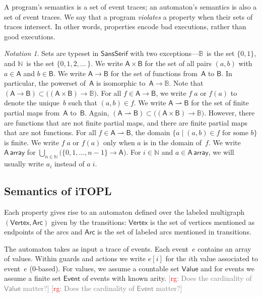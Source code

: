 \documentclass[preprint]{sigplanconf} %
\newcommand{\note}[2]{\textcolor{gray}{[\textcolor{red}{#1}: #2]}}
\newcommand{\rg}[1]{\note{rg}{#1}}
\newcommand{\B}{\ensuremath{\mathbb{B}}}
\newcommand{\N}{\ensuremath{\mathbb{N}}}
\newcommand{\pmap}{\rightharpoonup}
\newcommand{\set}[1]{\ensuremath{\mathsf{#1}}}
\theoremstyle{definition}
\theoremstyle{remark}
\newtheorem{notation}{Notation}
\begin{document}
A program's semantics is a set of event traces;
an automaton's semantics is also a set of event traces.
We say that a program \emph{violates} a property when their sets of traces intersect.
In other words, properties encode bad executions, rather than good executions.

\begin{notation}
Sets are typeset in \set{SansSerif} with two exceptions---$\B$~is the set $\{0,1\}$, and $\N$~is the set $\{0,1,2,\ldots\,\}$.
We write $\set A\times\set B$ for the set of all pairs $(a,b)$ with $a\in\set A$ and $b\in\set B$.
We write $\set A\to\set B$ for the set of functions from~\set A to \set B.
In particular, the powerset of~\set A is isomorphic to~$\set A\to\B$.
Note that $(\set A\to\set B)\subset\bigl((\set A\times\set B)\to\B\bigr)$.
For all $f\in\set A\to\set B$, we write $f\;a$ or $f(a)$ to denote the unique~$b$ such that $(a,b)\in f$.
We write $\set A\pmap\set B$ for the set of finite partial maps from~\set A to~\set B.
Again, $(\set A\pmap\set B)\subset\bigl((\set A\times\set B)\to\B\bigr)$.
However, there are functions that are not finite partial maps, and there are finite partial maps that are not functions.
For all $f\in\set A\pmap\set B$, the domain $\{a\mid\text{$(a,b)\in f$ for some $b$}\}$ is finite.
We write $f\;a$ or $f(a)$ only when $a$ is in the domain of~$f$.
We write $\set A\,\mathsf{array}$ for $\bigcup_{n\in\N}
\bigl(\{0,1,\ldots,n-1\}\to\set A\bigr)$.
For $i\in\N$ and $a\in\set A\,\mathsf{array}$, we will usually write $a_i$
instead of $a\;i$.
\end{notation}

\subsection{Semantics of iTOPL}\label{sec:semantics.itopl} %
Each property gives rise to an automaton defined over the labeled multigraph $(\set{Vertex}, \set{Arc})$ given by the transitions:
$\set{Vertex}$ is the set of vertices mentioned as endpoints of the arcs and $\set{Arc}$ is the set of labeled arcs mentioned in transitions.

The automaton takes as input a trace of events.
Each event~$e$ contains an array of values.
Within guards and actions we write $e[i]$ for the $i$th value associated to event~$e$ (0-based).
For values, we assume a countable set \set{Value} and for events we assume
a finite set \set{Event} of events with known arity.
\rg{Does the cardinality of \set{Value} matter?}
\rg{Does the cardinality of \set{Event} matter?}
\end{document}
